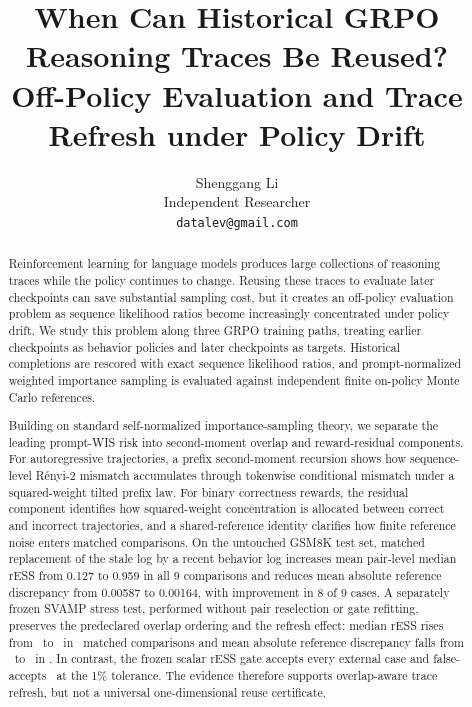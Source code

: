 \documentclass[10pt]{article}
\title{\textbf{When Can Historical GRPO Reasoning Traces Be Reused?}\\[0.25em]
\large Off-Policy Evaluation and Trace Refresh under Policy Drift}
\author{Shenggang Li\\Independent Researcher\\\texttt{datalev@gmail.com}}
\date{}
\theoremstyle{remark}
\begin{document}
\maketitle
\vspace{-1.4em}

\begin{abstract}
Reinforcement learning for language models produces large collections of reasoning traces while the policy continues to change. Reusing these traces to evaluate later checkpoints can save substantial sampling cost, but it creates an off-policy evaluation problem as sequence likelihood ratios become increasingly concentrated under policy drift. We study this problem along three GRPO training paths, treating earlier checkpoints as behavior policies and later checkpoints as targets. Historical completions are rescored with exact sequence likelihood ratios, and prompt-normalized weighted importance sampling is evaluated against independent finite on-policy Monte Carlo references.

Building on standard self-normalized importance-sampling theory, we separate the leading prompt-WIS risk into second-moment overlap and reward-residual components. For autoregressive trajectories, a prefix second-moment recursion shows how sequence-level R\'enyi-2 mismatch accumulates through tokenwise conditional mismatch under a squared-weight tilted prefix law. For binary correctness rewards, the residual component identifies how squared-weight concentration is allocated between correct and incorrect trajectories, and a shared-reference identity clarifies how finite reference noise enters matched comparisons. On the untouched GSM8K test set, matched replacement of the stale log by a recent behavior log increases mean pair-level median rESS from 0.127 to 0.959 in all 9 comparisons and reduces mean absolute reference discrepancy from 0.00587 to 0.00164, with improvement in 8 of 9 cases. A separately frozen SVAMP stress test, performed without pair reselection or gate refitting, preserves the predeclared overlap ordering and the refresh effect: median rESS rises from \SvOldRess\ to \SvRecentRess\ in \SvMatchedRessCount\ matched comparisons and mean absolute reference discrepancy falls from \SvOldMAE\ to \SvRecentMAE\ in \SvMatchedMAECount. In contrast, the frozen scalar rESS gate accepts every external case and false-accepts \SvGateFAOne\ at the 1\% tolerance. The evidence therefore supports overlap-aware trace refresh, but not a universal one-dimensional reuse certificate.
\end{abstract}
\end{document}
